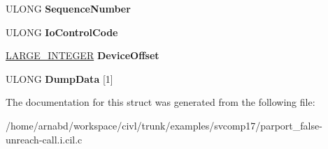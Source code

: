 \begin{DoxyCompactItemize}
\item 
\hypertarget{struct__IO__ERROR__LOG__PACKET_a82ec915d450fc4f3cafb46d8fe2df2cd}{}U\+L\+O\+N\+G {\bfseries Sequence\+Number}\label{struct__IO__ERROR__LOG__PACKET_a82ec915d450fc4f3cafb46d8fe2df2cd}

\item 
\hypertarget{struct__IO__ERROR__LOG__PACKET_a3e98e0c72ca2bcfa59d6c66adb241b8a}{}U\+L\+O\+N\+G {\bfseries Io\+Control\+Code}\label{struct__IO__ERROR__LOG__PACKET_a3e98e0c72ca2bcfa59d6c66adb241b8a}

\item 
\hypertarget{struct__IO__ERROR__LOG__PACKET_a763391993f54bf6cc7e0b91e3b1e543d}{}\hyperlink{union__LARGE__INTEGER}{L\+A\+R\+G\+E\+\_\+\+I\+N\+T\+E\+G\+E\+R} {\bfseries Device\+Offset}\label{struct__IO__ERROR__LOG__PACKET_a763391993f54bf6cc7e0b91e3b1e543d}

\item 
\hypertarget{struct__IO__ERROR__LOG__PACKET_a29cf2633c7b73d616ac01d1a7bf41321}{}U\+L\+O\+N\+G {\bfseries Dump\+Data} \mbox{[}1\mbox{]}\label{struct__IO__ERROR__LOG__PACKET_a29cf2633c7b73d616ac01d1a7bf41321}

\end{DoxyCompactItemize}


The documentation for this struct was generated from the following file\+:\begin{DoxyCompactItemize}
\item 
/home/arnabd/workspace/civl/trunk/examples/svcomp17/parport\+\_\+false-\/unreach-\/call.\+i.\+cil.\+c\end{DoxyCompactItemize}
